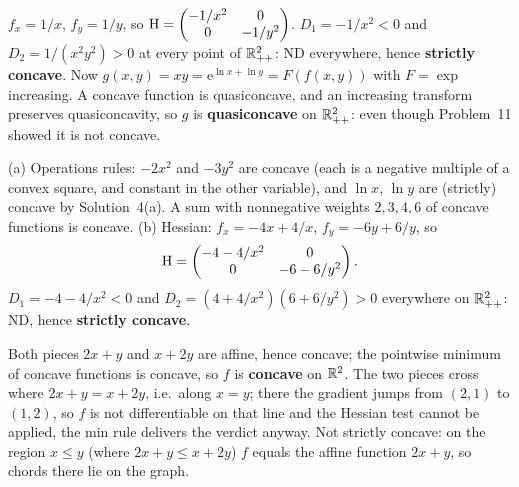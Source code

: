 \begin{solutions}
  \item $f_x=1/x$, $f_y=1/y$, so
        $\operatorname{H}=\begin{pmatrix}-1/x^{2}&0\\0&-1/y^{2}\end{pmatrix}$.
        $D_1=-1/x^{2}<0$ and $D_2=1/(x^{2}y^{2})>0$ at every point of
        $\mathbb{R}^{2}_{++}$: ND everywhere, hence \textbf{strictly concave}.
        Now $g(x,y)=xy=\mathrm{e}^{\ln x+\ln y}=F(f(x,y))$ with
        $F=\exp$ increasing. A concave function is quasiconcave, and an
        increasing transform preserves quasiconcavity, so $g$ is
        \textbf{quasiconcave} on $\mathbb{R}^{2}_{++}$: even though Problem~11
        showed it is not concave.

  \item (a) Operations rules: $-2x^{2}$ and $-3y^{2}$ are concave (each is
        a negative multiple of a convex square, and constant in the other
        variable), and $\ln x$, $\ln y$ are (strictly) concave by
        Solution~4(a). A sum with nonnegative weights $2,3,4,6$ of concave
        functions is concave. \;
        (b) Hessian: $f_x=-4x+4/x$, $f_y=-6y+6/y$, so
        \[
          \operatorname{H}=\begin{pmatrix}-4-4/x^{2}&0\\0&-6-6/y^{2}\end{pmatrix}.
        \]
        $D_1=-4-4/x^{2}<0$ and
        $D_2=(4+4/x^{2})(6+6/y^{2})>0$ everywhere on $\mathbb{R}^{2}_{++}$: ND,
        hence \textbf{strictly concave}.

  \item Both pieces $2x+y$ and $x+2y$ are affine, hence concave; the
        pointwise minimum of concave functions is concave, so $f$ is
        \textbf{concave} on $\mathbb{R}^{2}$. The two pieces cross where
        $2x+y=x+2y$, i.e.\ along $x=y$; there the gradient jumps from
        $(2,1)$ to $(1,2)$, so $f$ is not differentiable on that line and
        the Hessian test cannot be applied, the min rule delivers the
        verdict anyway. Not strictly concave: on the region $x\le y$
        (where $2x+y\le x+2y$) $f$ equals the affine function $2x+y$, so
        chords there lie on the graph.


\end{solutions}
